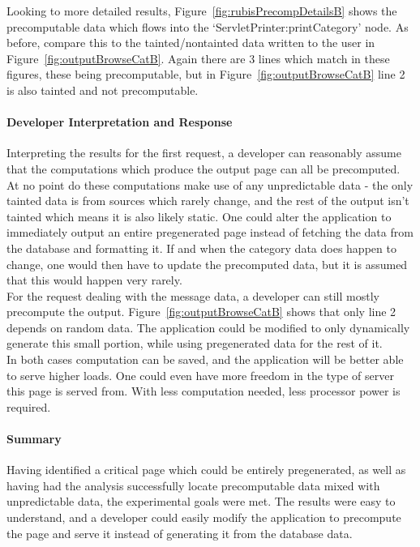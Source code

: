 \documentclass[msc,oneside]{ubcthesis}
\begin{document}
Looking to more detailed results, Figure~\ref{fig:rubisPrecompDetailsB} shows the precomputable data which flows into the `ServletPrinter:printCategory' node. As before, compare this to the tainted/nontainted data written to the user in Figure~\ref{fig:outputBrowseCatB}. Again there are 3 lines which match in these figures, these being precomputable, but in Figure~\ref{fig:outputBrowseCatB} line 2 is also tainted and not precomputable.

\paragraph{Developer Interpretation and Response}

Interpreting the results for the first request, a developer can reasonably assume that the computations which produce the output page can all be precomputed. At no point do these computations make use of any unpredictable data - the only tainted data is from sources which rarely change, and the rest of the output isn't tainted which means it is also likely static. One could alter the application to immediately output an entire pregenerated page instead of fetching the data from the database and formatting it. If and when the category data does happen to change, one would then have to update the precomputed data, but it is assumed that this would happen very rarely.\\

For the request dealing with the message data, a developer can still mostly precompute the output. Figure~\ref{fig:outputBrowseCatB} shows that only line 2 depends on random data. The application could be modified to only dynamically generate this small portion, while using pregenerated data for the rest of it.\\

In both cases computation can be saved, and the application will be better able to serve higher loads. One could even have more freedom in the type of server this page is served from. With less computation needed, less processor power is required.

\paragraph{Summary}
Having identified a critical page which could be entirely pregenerated, as well as having had the analysis successfully locate precomputable data mixed with unpredictable data, the experimental goals were met. The results were easy to understand, and a developer could easily modify the application to precompute the page and serve it instead of generating it from the database data.
\end{document}
